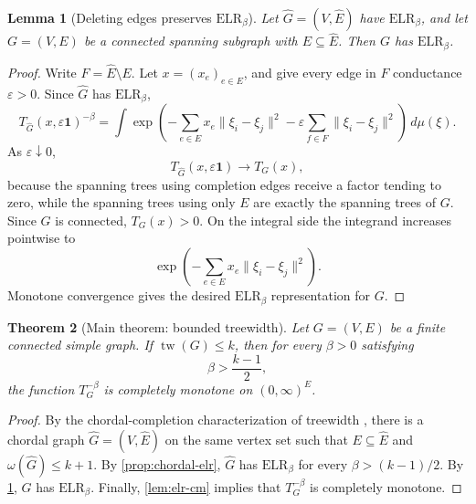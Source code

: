 \documentclass[preprint,12pt,authoryear]{elsarticle}
\numberwithin{equation}{section}
\newtheorem{theorem}{Theorem}[section]
\newtheorem{lemma}[theorem]{Lemma}
\theoremstyle{definition}
\theoremstyle{remark}
\newcommand{\1}{\mathbf{1}}
\newcommand{\tw}{\operatorname{tw}}
\newcommand{\ELR}{\mathrm{ELR}}
\begin{document}
\begin{lemma}[Deleting edges preserves \(\ELR_\beta\)]
\label{lem:edge-deletion-elr}
Let \(\widehat G=(V,\widehat E)\) have \(\ELR_\beta\), and let \(G=(V,E)\) be a connected spanning subgraph with \(E\subseteq\widehat E\).  Then \(G\) has \(\ELR_\beta\).
\end{lemma}

\begin{proof}
Write \(F=\widehat E\setminus E\).  Let \(x=(x_e)_{e\in E}\), and give every edge in \(F\) conductance \(\varepsilon>0\).  Since \(\widehat G\) has \(\ELR_\beta\),
\begin{equation}
        T_{\widehat G}(x,\varepsilon\mathbf 1)^{-\beta}
        =
        \int
        \exp\left(
        -\sum_{e\in E}x_e\|\xi_i-\xi_j\|^2
        -\varepsilon\sum_{f\in F}\|\xi_i-\xi_j\|^2
        \right)\,d\mu(\xi).
\end{equation}
As \(\varepsilon\downarrow0\),
\begin{equation}
        T_{\widehat G}(x,\varepsilon\mathbf 1)\longrightarrow T_G(x),
\end{equation}
because the spanning trees using completion edges receive a factor tending to zero, while the spanning trees using only \(E\) are exactly the spanning trees of \(G\).  Since \(G\) is connected, \(T_G(x)>0\).  On the integral side the integrand increases pointwise to
\begin{equation}
        \exp\left(-\sum_{e\in E}x_e\|\xi_i-\xi_j\|^2\right).
\end{equation}
Monotone convergence gives the desired \(\ELR_\beta\) representation for \(G\).
\end{proof}

\begin{theorem}[Main theorem: bounded treewidth]
\label{thm:bounded-treewidth}
Let \(G=(V,E)\) be a finite connected simple graph.  If \(\tw(G)\le k\), then for every \(\beta>0\) satisfying
\begin{equation}
        \beta>\frac{k-1}{2},
\end{equation}
the function \(T_G^{-\beta}\) is completely monotone on \((0,\infty)^E\).
\end{theorem}

\begin{proof}
By the chordal-completion characterization of treewidth \cite{Bodlaender1998}, there is a chordal graph \(\widehat G=(V,\widehat E)\) on the same vertex set such that \(E\subseteq\widehat E\) and \(\omega(\widehat G)\le k+1\).  By \cref{prop:chordal-elr}, \(\widehat G\) has \(\ELR_\beta\) for every \(\beta>(k-1)/2\).  By \cref{lem:edge-deletion-elr}, \(G\) has \(\ELR_\beta\).  Finally, \cref{lem:elr-cm} implies that \(T_G^{-\beta}\) is completely monotone.
\end{proof}
\end{document}

